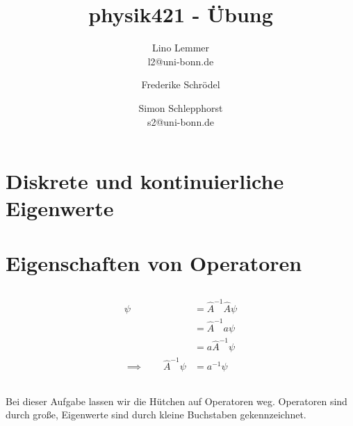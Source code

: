 

\setcounter{thezettel}{5}
\renewcommand\thesection{\arabic{thezettel}.\arabic{section}}


\title{physik421 - Übung }
\author{Lino Lemmer \\ \small{l2@uni-bonn.de} \and Frederike Schrödel \and Simon Schlepphorst\\ \small{s2@uni-bonn.de}}


\maketitle

\section{Diskrete und kontinuierliche Eigenwerte}
\section{Eigenschaften von Operatoren}

\subsection{}

\begin{align*}
    \psi &= \hat A^{-1} \hat A \psi \\
         &= \hat A^{-1} a \psi \\
         &= a \hat A^{-1} \psi \\
    \implies\qquad \hat A^{-1} \psi &= a^{-1}\psi
\end{align*}

\subsection{}

Bei dieser Aufgabe lassen wir die Hütchen auf Operatoren weg. Operatoren sind durch große, Eigenwerte sind durch kleine Buchstaben gekennzeichnet.

